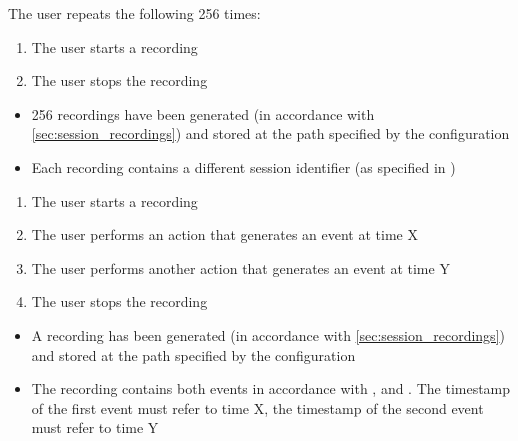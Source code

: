 \begin{tests}
    {The \gls{user} repeats the following 256 times:
    \begin{enumerate}
        \item The \gls{user} starts a recording
        \item The \gls{user} stops the recording
    \end{enumerate}}
    {\begin{itemize}
        \item 256 recordings have been generated (in accordance with \ref{sec:session_recordings}) and stored at the path specified by the configuration
        \item Each recording contains a different session identifier (as specified in )
    \end{itemize}}

    {\begin{enumerate}
        \item The \gls{user} starts a recording
        \item The \gls{user} performs an action that generates an \gls{event} at time X
        \item The \gls{user} performs another action that generates an \gls{event} at time Y
        \item The \gls{user} stops the recording
    \end{enumerate}}
    {\begin{itemize}
        \item A recording has been generated (in accordance with \ref{sec:session_recordings}) and stored at the path specified by the configuration
        \item The recording contains both events in accordance with ,  and . The timestamp of the first event must refer to time X, the timestamp of the second event must refer to time Y
    \end{itemize}}


\end{tests}

